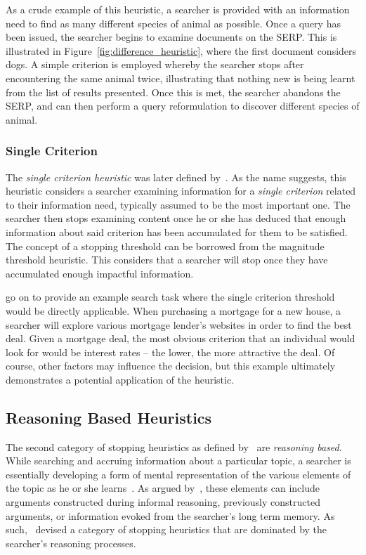 As a crude example of this heuristic, a searcher is provided with an information need to find as many different species of animal as possible. Once a query has been issued, the searcher begins to examine documents on the SERP. This is illustrated in Figure~\ref{fig:difference_heuristic}, where the first document considers dogs. A simple criterion is employed whereby the searcher stops after encountering the same animal twice, illustrating that nothing new is being learnt from the list of results presented. Once this is met, the searcher abandons the SERP, and can then perform a query reformulation to discover different species of animal.

\subsubsection{Single Criterion}
The \emph{single criterion heuristic} was later defined by~\cite{browne2005stopping_rules}. As the name suggests, this heuristic considers a searcher examining information for a \emph{single criterion} related to their information need, typically assumed to be the most important one. The searcher then stops examining content once he or she has deduced that enough information about said criterion has been accumulated for them to be satisfied. The concept of a stopping threshold can be borrowed from the magnitude threshold heuristic. This considers that a searcher will stop once they have accumulated enough impactful information.

\cite{browne2005stopping_rules} go on to provide an example search task where the single criterion threshold would be directly applicable. When purchasing a mortgage for a new house, a searcher will explore various mortgage lender's websites in order to find the best deal. Given a mortgage deal, the most obvious criterion that an individual would look for would be interest rates -- the lower, the more attractive the deal. Of course, other factors may influence the decision, but this example ultimately demonstrates a potential application of the heuristic.

\subsection{Reasoning Based Heuristics}
The second category of stopping heuristics as defined by~\citep{nickles1995judgment} are \emph{reasoning based}. While searching and accruing information about a particular topic, a searcher is essentially developing a form of mental representation of the various elements of the topic as he or she learns~\citep{yates1990decision_making}. As argued by~\citep{nickles1995judgment}, these elements can include arguments constructed during informal reasoning, previously constructed arguments, or information evoked from the searcher's long term memory. As such,~\citep{nickles1995judgment} devised a category of stopping heuristics that are dominated by the searcher's reasoning processes.

